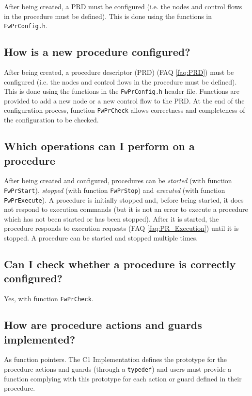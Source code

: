 \documentclass[faq]{../fwprofile}
\begin{document}
After being created, a PRD must be configured (i.e. the nodes and control flows in the procedure must be defined). This is done using the functions 
in \texttt{FwPrConfig.h}.

\subsection{How is a new procedure configured?}
After being created, a procedure descriptor (PRD) (FAQ \ref{faq:PRD}) must be configured (i.e. the nodes and control flows in the procedure must be defined). 
This is done using the functions in the \texttt{FwPrConfig.h} header file. Functions are provided to add a new node or a new control flow to the PRD. 
At the end of the configuration process, function \texttt{FwPrCheck} allows correctness and completeness of the configuration to be checked.

\subsection{Which operations can I perform on a procedure}
After being created and configured, procedures can be \emph{started} (with function \texttt{FwPrStart}), \emph{stopped} (with function 
\texttt{FwPrStop}) and \emph{executed} (with function \texttt{FwPrExecute}). A procedure is initially stopped and, before being started, 
it does not respond to execution commands (but it is not an error to execute a procedure which has not been started or has been stopped). 
After it is started, the procedure responds to execution requests (FAQ \ref{faq:PR_Execution}) until it is stopped. A procedure can be started 
and stopped multiple times.

\subsection{Can I check whether a procedure is correctly configured?}
Yes, with function \texttt{FwPrCheck}.

\subsection{How are procedure actions and guards implemented?}
As function pointers. The C1 Implementation defines the prototype for the procedure actions and guards (through a \texttt{typedef}) and users must provide 
a function complying with this prototype for each action or guard defined in their procedure.  
\end{document}
